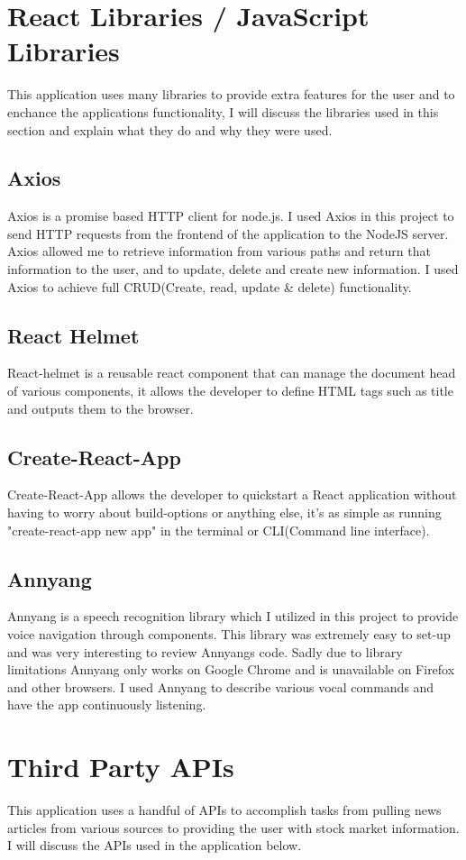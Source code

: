 \section{React Libraries / JavaScript Libraries}
This application uses many libraries to provide extra features for the user and to enchance the applications functionality, I will discuss the libraries used in this section and explain what they do and why they were used.
\subsection{Axios}
Axios is a promise based HTTP client for node.js\cite{Axios}.  I used Axios in this project to send HTTP requests from the frontend of the application to the NodeJS server.  Axios allowed me to retrieve information from various paths and return that information to the user, and to update, delete and create new information.  I used Axios to achieve full CRUD(Create, read, update \& delete) functionality.
\subsection{React Helmet}
React-helmet is a reusable react component that can manage the document head of various components, it allows the developer to define HTML tags such as title and outputs them to the browser\cite{ReactHelmet}.
\subsection{Create-React-App}
Create-React-App allows the developer to quickstart a React application without having to worry about build-options or anything else, it's as simple as running "create-react-app new app" in the terminal or CLI(Command line interface)\cite{CreateReactApp}.
\subsection{Annyang}
Annyang is a speech recognition library which I utilized in this project to provide voice navigation through components.  This library was extremely easy to set-up and was very interesting to review Annyangs code.  Sadly due to library limitations Annyang only works on Google Chrome and is unavailable on Firefox and other browsers.  I used Annyang to describe various vocal commands and have the app continuously listening.
\section{Third Party APIs}
This application uses a handful of APIs to accomplish tasks from pulling news articles from various sources to providing the user with stock market information.  I will discuss the APIs used in the application below.
